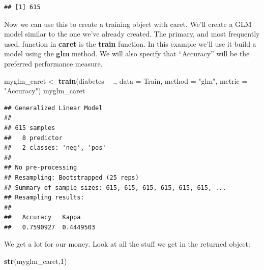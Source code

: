 \documentclass[
]{book}
\newenvironment{Shaded}{\begin{snugshade}}{\end{snugshade}}
\newcommand{\DataTypeTok}[1]{\textcolor[rgb]{0.13,0.29,0.53}{#1}}
\newcommand{\DecValTok}[1]{\textcolor[rgb]{0.00,0.00,0.81}{#1}}
\newcommand{\KeywordTok}[1]{\textcolor[rgb]{0.13,0.29,0.53}{\textbf{#1}}}
\newcommand{\NormalTok}[1]{#1}
\newcommand{\OperatorTok}[1]{\textcolor[rgb]{0.81,0.36,0.00}{\textbf{#1}}}
\newcommand{\StringTok}[1]{\textcolor[rgb]{0.31,0.60,0.02}{#1}}
\begin{document}
\begin{verbatim}
## [1] 615
\end{verbatim}

Now we can use this to create a training object with caret. We'll create a GLM model similar to the one we've already created. The primary, and most frequently used, function in \textbf{caret} is the \textbf{train} function. In this example we'll use it build a model using the \textbf{glm} method. We will also specify that ``Accuracy'' will be the preferred performance measure.

\begin{Shaded}
\begin{Highlighting}[]
\NormalTok{myglm_caret <-}\StringTok{ }\KeywordTok{train}\NormalTok{(diabetes }\OperatorTok{~}\StringTok{ }\NormalTok{.,}
                     \DataTypeTok{data =}\NormalTok{ Train,}
                     \DataTypeTok{method =} \StringTok{"glm"}\NormalTok{,}
                     \DataTypeTok{metric =} \StringTok{"Accuracy"}\NormalTok{)}
\NormalTok{myglm_caret}
\end{Highlighting}
\end{Shaded}

\begin{verbatim}
## Generalized Linear Model 
## 
## 615 samples
##   8 predictor
##   2 classes: 'neg', 'pos' 
## 
## No pre-processing
## Resampling: Bootstrapped (25 reps) 
## Summary of sample sizes: 615, 615, 615, 615, 615, 615, ... 
## Resampling results:
## 
##   Accuracy   Kappa    
##   0.7590927  0.4449503
\end{verbatim}

We get a lot for our money. Look at all the stuff we get in the returned object:

\begin{Shaded}
\begin{Highlighting}[]
\KeywordTok{str}\NormalTok{(myglm_caret,}\DecValTok{1}\NormalTok{)}
\end{Highlighting}
\end{Shaded}
\end{document}
